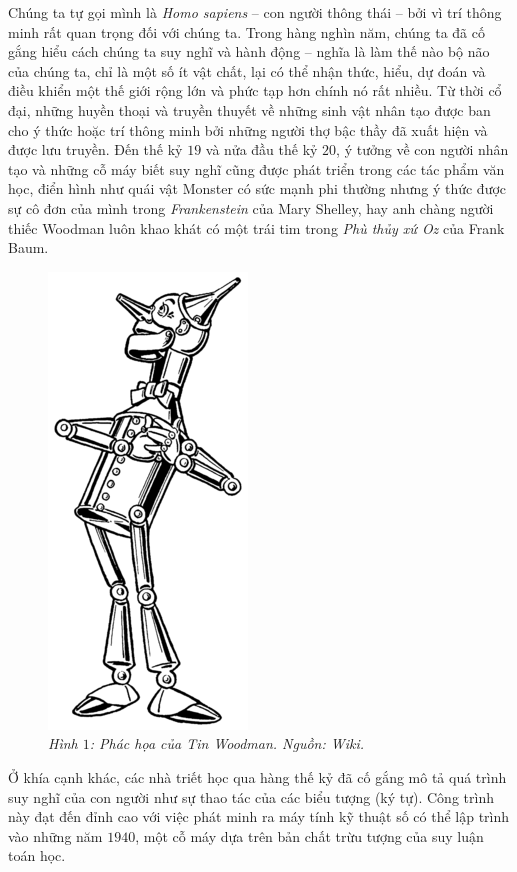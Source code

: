 \begin{multicols}{2}
	Chúng ta tự gọi mình là \textit{Homo sapiens} -- con người thông thái -- bởi vì trí thông minh rất quan trọng đối với chúng ta. Trong hàng nghìn năm, chúng ta đã cố gắng hiểu cách chúng ta suy nghĩ và hành động -- nghĩa là làm thế nào bộ não của chúng ta, chỉ là một số ít vật chất, lại có thể nhận thức, hiểu, dự đoán và điều khiển một thế giới rộng lớn và phức tạp hơn chính nó rất nhiều. Từ thời cổ đại, những huyền thoại và truyền thuyết về những sinh vật nhân tạo được ban cho ý thức hoặc trí thông minh bởi những người thợ bậc thầy đã xuất hiện và được lưu truyền. Đến thế kỷ $19$ và nửa đầu thế kỷ $20$, ý tưởng về con người nhân tạo và những cỗ máy biết suy nghĩ cũng được phát triển trong các tác phẩm văn học, điển hình như quái vật Monster có sức mạnh phi thường nhưng ý thức được sự cô đơn của mình trong \textit{Frankenstein} của Mary Shelley, hay anh chàng người thiếc Woodman luôn khao khát có một trái tim trong \textit{Phù thủy xứ Oz} của Frank Baum.
	\begin{figure}[H]
		\vspace*{-5pt}
		\centering
		\captionsetup{labelformat= empty, justification=centering}
		\includegraphics[width= 0.4\linewidth]{Tin_Woodman.png}
		\caption{\small\textit{\color{cackithi}Hình $1$: Phác họa của Tin Woodman. Nguồn: Wiki.}}
		\vspace*{-10pt}
	\end{figure}
	Ở khía cạnh khác, các nhà triết học qua hàng thế kỷ đã cố gắng mô tả quá trình suy nghĩ của con người như sự thao tác của các biểu tượng (ký tự). Công trình này đạt đến đỉnh cao với việc phát minh ra máy tính kỹ thuật số có thể lập trình vào những năm $1940$, một cỗ máy dựa trên bản chất trừu tượng của suy luận toán học. 

\end{multicols}

